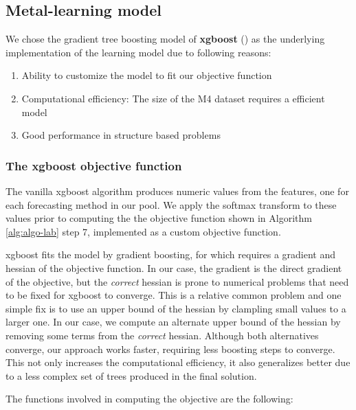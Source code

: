 \documentclass[11pt,a4paper,]{article}
\providecommand{\tightlist}{%
  \setlength{\itemsep}{0pt}\setlength{\parskip}{0pt}}
\theoremstyle{definition}
\theoremstyle{definition}
\theoremstyle{definition}
\theoremstyle{remark}
\begin{document}

\subsection{Metal-learning model}\label{metal-learning-model}

We chose the gradient tree boosting model of \textbf{xgboost}
(\textcite{chen2016xgboost}) as the underlying implementation of the
learning model due to following reasons:

\begin{enumerate}
\def\labelenumi{\arabic{enumi}.}
\tightlist
\item
  Ability to customize the model to fit our objective function
\item
  Computational efficiency: The size of the M4 dataset requires a
  efficient model
\item
  Good performance in structure based problems
\end{enumerate}

\subsubsection{The xgboost objective
function}\label{the-xgboost-objective-function}

The vanilla xgboost algorithm produces numeric values from the features,
one for each forecasting method in our pool. We apply the softmax
transform to these values prior to computing the the objective function
shown in Algorithm \ref{alg:algo-lab} step 7, implemented as a custom
objective function.

xgboost fits the model by gradient boosting, for which requires a
gradient and hessian of the objective function. In our case, the
gradient is the direct gradient of the objective, but the \emph{correct}
hessian is prone to numerical problems that need to be fixed for xgboost
to converge. This is a relative common problem and one simple fix is to
use an upper bound of the hessian by clampling small values to a larger
one. In our case, we compute an alternate upper bound of the hessian by
removing some terms from the \emph{correct} hessian. Although both
alternatives converge, our approach works faster, requiring less
boosting steps to converge. This not only increases the computational
efficiency, it also generalizes better due to a less complex set of
trees produced in the final solution.

The functions involved in computing the objective are the following:
\end{document}

